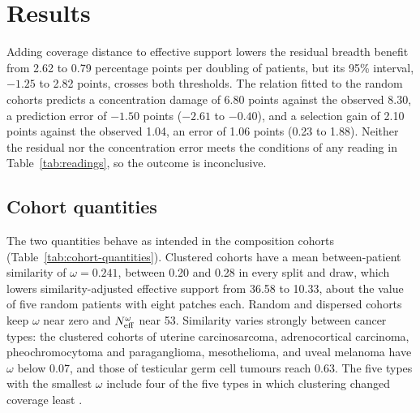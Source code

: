 \section{Results}
\label{sec:results}
Adding coverage distance to effective support lowers the residual breadth benefit from 2.62 to 0.79 percentage points per doubling of patients, but its 95\% interval, $-1.25$ to 2.82 points, crosses both thresholds. The relation fitted to the random cohorts predicts a concentration damage of 6.80 points against the observed 8.30, a prediction error of $-1.50$ points ($-2.61$ to $-0.40$), and a selection gain of 2.10 points against the observed 1.04, an error of 1.06 points (0.23 to 1.88). Neither the residual nor the concentration error meets the conditions of any reading in Table~\ref{tab:readings}, so the outcome is inconclusive.

\subsection{Cohort quantities}
\label{sec:quantity-results}
The two quantities behave as intended in the composition cohorts (Table~\ref{tab:cohort-quantities}). Clustered cohorts have a mean between-patient similarity of $\omega=0.241$, between 0.20 and 0.28 in every split and draw, which lowers similarity-adjusted effective support from 36.58 to 10.33, about the value of five random patients with eight patches each. Random and dispersed cohorts keep $\omega$ near zero and $N_{\mathrm{eff}}^{\omega}$ near 53. Similarity varies strongly between cancer types: the clustered cohorts of uterine carcinosarcoma, adrenocortical carcinoma, pheochromocytoma and paraganglioma, mesothelioma, and uveal melanoma have $\omega$ below 0.07, and those of testicular germ cell tumours reach 0.63. The five types with the smallest $\omega$ include four of the five types in which clustering changed coverage least \citep{queisler2026cohortComposition}.

